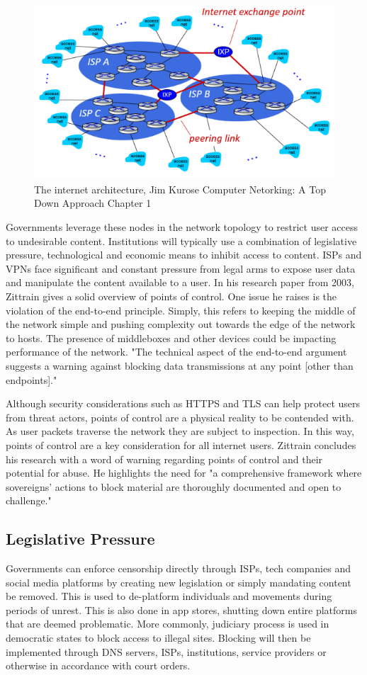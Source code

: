 \begin{figure} [H]
    \centering
    \includegraphics[width=0.5\linewidth]{State of the Art/KuroseISPs.png}
    \caption{The internet architecture, Jim Kurose Computer Netorking: A Top Down Approach Chapter 1}
    \label{fig:enter-label}
\end{figure}

Governments leverage these nodes in the network topology to restrict user access to undesirable content.  Institutions will typically use a combination of legislative pressure, technological and economic means to inhibit access to content. ISPs and VPNs face significant and constant pressure from legal arms to expose user data and manipulate the content available to a user. In his research paper from 2003, Zittrain gives a solid overview of points of control. One issue he raises is the violation of the end-to-end principle. Simply, this refers to keeping the middle of the network simple and pushing complexity out towards the edge of the network to hosts. The presence of middleboxes and other devices could be impacting performance of the network. "The technical aspect of the end-to-end argument suggests a warning against blocking data transmissions at any point [other than endpoints]." \cite{Zittrain_Internet_Points_of_Control} 

Although security considerations such as HTTPS and TLS can help protect users from threat actors, points of control are a physical reality to be contended with. As user packets traverse the network they are subject to inspection. In this way, points of control are a key consideration for all internet users. Zittrain concludes his research with a word of warning regarding points of control and their potential for abuse. He highlights the need for "a comprehensive framework where sovereigns’ actions to block material are thoroughly documented and open to challenge." \cite{Zittrain_Internet_Points_of_Control} 

\subsection{Legislative Pressure}
Governments can enforce censorship directly through ISPs, tech companies and social media platforms by creating new legislation or simply mandating content be removed. This is used to de-platform individuals and movements during periods of unrest. This is also done in app stores, shutting down entire platforms that are deemed problematic. More commonly, judiciary process is used in democratic states to block access to illegal sites. Blocking will then be implemented through DNS servers, ISPs, institutions, service providers or otherwise in accordance with court orders. 


